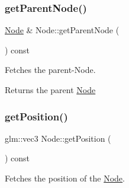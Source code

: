 \subsubsection{\texorpdfstring{getParentNode()}{getParentNode()}}
{\footnotesize\ttfamily \mbox{\hyperlink{classsage_1_1Node}{Node}} \& Node\+::get\+Parent\+Node (\begin{DoxyParamCaption}{ }\end{DoxyParamCaption}) const\hspace{0.3cm}{\ttfamily [protected]}}



Fetches the parent-\/\+Node. 

\begin{DoxyReturn}{Returns}
the parent \mbox{\hyperlink{classsage_1_1Node}{Node}} 
\end{DoxyReturn}
\mbox{\label{classsage_1_1Node_a11fbdf2a2dcdf8bdc014df65f3003925}} 
\subsubsection{\texorpdfstring{getPosition()}{getPosition()}}
{\footnotesize\ttfamily glm\+::vec3 Node\+::get\+Position (\begin{DoxyParamCaption}{ }\end{DoxyParamCaption}) const}



Fetches the position of the \mbox{\hyperlink{classsage_1_1Node}{Node}}. 

